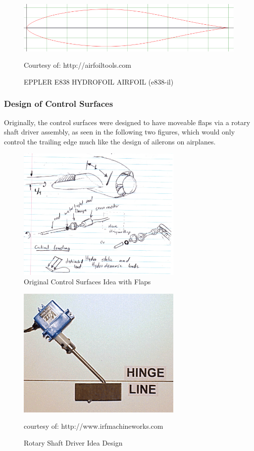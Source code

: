 \documentclass{report}
\begin{document}
\begin{figure}[H]
\centering
\includegraphics[width=12cm]{eppler}
\caption{EPPLER E838 HYDROFOIL AIRFOIL (e838-il)}
Courtesy of: http://airfoiltools.com
\end{figure}
\subsubsection{Design of Control Surfaces}
Originally, the control surfaces were designed to have moveable flaps via a rotary shaft driver assembly, as seen in the following two figures, which would only control the trailing edge much like the design of ailerons on airplanes.
\begin{figure}[H]
\centering
\includegraphics[width=8cm]{cso}
\caption{Original Control Surfaces Idea with Flaps}
\end{figure}
\begin{figure}[H]
\centering
\includegraphics[width=8cm]{Hinge}
\caption{Rotary Shaft Driver Idea Design}
courtesy of: http://www.irfmachineworks.com
\end{figure}
\end{document}
